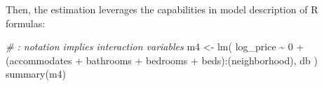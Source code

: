 \documentclass[
]{book}
\newenvironment{Shaded}{\begin{snugshade}}{\end{snugshade}}
\newcommand{\CommentTok}[1]{\textcolor[rgb]{0.56,0.35,0.01}{\textit{#1}}}
\newcommand{\DecValTok}[1]{\textcolor[rgb]{0.00,0.00,0.81}{#1}}
\newcommand{\FunctionTok}[1]{\textcolor[rgb]{0.00,0.00,0.00}{#1}}
\newcommand{\NormalTok}[1]{#1}
\newcommand{\OtherTok}[1]{\textcolor[rgb]{0.56,0.35,0.01}{#1}}
\newcommand{\SpecialCharTok}[1]{\textcolor[rgb]{0.00,0.00,0.00}{#1}}
\newcommand{\StringTok}[1]{\textcolor[rgb]{0.31,0.60,0.02}{#1}}
\begin{document}
\begin{Shaded}
\end{Shaded}

Then, the estimation leverages the capabilities in model description of R formulas:

\begin{Shaded}
\begin{Highlighting}[]
\CommentTok{\# \textasciigrave{}:\textasciigrave{} notation implies interaction variables}
\NormalTok{m4 }\OtherTok{\textless{}{-}} \FunctionTok{lm}\NormalTok{(}
  \StringTok{\textquotesingle{}log\_price \textasciitilde{} 0 + (accommodates + bathrooms + bedrooms + beds):(neighborhood)\textquotesingle{}}\NormalTok{, }
\NormalTok{  db}
\NormalTok{)}
\FunctionTok{summary}\NormalTok{(m4)}
\end{Highlighting}
\end{Shaded}
\end{document}
